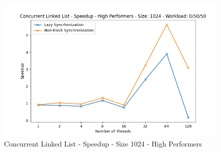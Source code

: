 \documentclass[../final_report.tex]{subfiles}
\begin{document}
\begin{figure}[H]
        \includegraphics[scale=0.4]{outFiles/plots/concurrent_data_structs_high_speedup_1024_0_50_50.png}
    \caption{Concurrent Linked List - Speedup - Size 1024 - High Performers}
    \label{fig:Concurrent Linked List - Speedup - Size 1024 - High Performers}
\end{figure}
\end{document}
